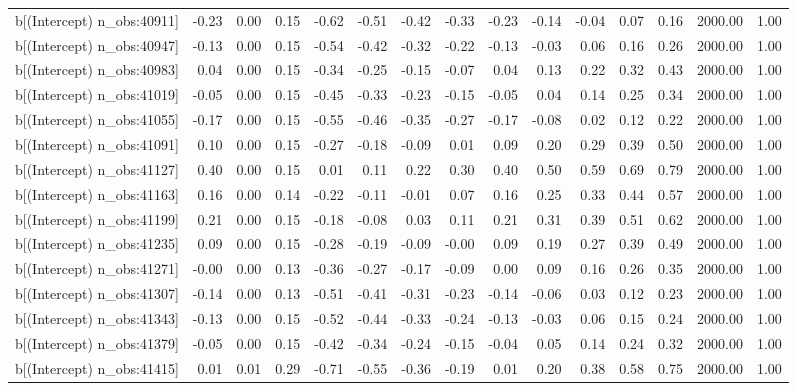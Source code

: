 \begin{table}[ht]
\begin{tabular}{rrrrrrrrrrrrrrr}
  b[(Intercept) n\_obs:40911] & -0.23 & 0.00 & 0.15 & -0.62 & -0.51 & -0.42 & -0.33 & -0.23 & -0.14 & -0.04 & 0.07 & 0.16 & 2000.00 & 1.00 \\ 
  b[(Intercept) n\_obs:40947] & -0.13 & 0.00 & 0.15 & -0.54 & -0.42 & -0.32 & -0.22 & -0.13 & -0.03 & 0.06 & 0.16 & 0.26 & 2000.00 & 1.00 \\ 
  b[(Intercept) n\_obs:40983] & 0.04 & 0.00 & 0.15 & -0.34 & -0.25 & -0.15 & -0.07 & 0.04 & 0.13 & 0.22 & 0.32 & 0.43 & 2000.00 & 1.00 \\ 
  b[(Intercept) n\_obs:41019] & -0.05 & 0.00 & 0.15 & -0.45 & -0.33 & -0.23 & -0.15 & -0.05 & 0.04 & 0.14 & 0.25 & 0.34 & 2000.00 & 1.00 \\ 
  b[(Intercept) n\_obs:41055] & -0.17 & 0.00 & 0.15 & -0.55 & -0.46 & -0.35 & -0.27 & -0.17 & -0.08 & 0.02 & 0.12 & 0.22 & 2000.00 & 1.00 \\ 
  b[(Intercept) n\_obs:41091] & 0.10 & 0.00 & 0.15 & -0.27 & -0.18 & -0.09 & 0.01 & 0.09 & 0.20 & 0.29 & 0.39 & 0.50 & 2000.00 & 1.00 \\ 
  b[(Intercept) n\_obs:41127] & 0.40 & 0.00 & 0.15 & 0.01 & 0.11 & 0.22 & 0.30 & 0.40 & 0.50 & 0.59 & 0.69 & 0.79 & 2000.00 & 1.00 \\ 
  b[(Intercept) n\_obs:41163] & 0.16 & 0.00 & 0.14 & -0.22 & -0.11 & -0.01 & 0.07 & 0.16 & 0.25 & 0.33 & 0.44 & 0.57 & 2000.00 & 1.00 \\ 
  b[(Intercept) n\_obs:41199] & 0.21 & 0.00 & 0.15 & -0.18 & -0.08 & 0.03 & 0.11 & 0.21 & 0.31 & 0.39 & 0.51 & 0.62 & 2000.00 & 1.00 \\ 
  b[(Intercept) n\_obs:41235] & 0.09 & 0.00 & 0.15 & -0.28 & -0.19 & -0.09 & -0.00 & 0.09 & 0.19 & 0.27 & 0.39 & 0.49 & 2000.00 & 1.00 \\ 
  b[(Intercept) n\_obs:41271] & -0.00 & 0.00 & 0.13 & -0.36 & -0.27 & -0.17 & -0.09 & 0.00 & 0.09 & 0.16 & 0.26 & 0.35 & 2000.00 & 1.00 \\ 
  b[(Intercept) n\_obs:41307] & -0.14 & 0.00 & 0.13 & -0.51 & -0.41 & -0.31 & -0.23 & -0.14 & -0.06 & 0.03 & 0.12 & 0.23 & 2000.00 & 1.00 \\ 
  b[(Intercept) n\_obs:41343] & -0.13 & 0.00 & 0.15 & -0.52 & -0.44 & -0.33 & -0.24 & -0.13 & -0.03 & 0.06 & 0.15 & 0.24 & 2000.00 & 1.00 \\ 
  b[(Intercept) n\_obs:41379] & -0.05 & 0.00 & 0.15 & -0.42 & -0.34 & -0.24 & -0.15 & -0.04 & 0.05 & 0.14 & 0.24 & 0.32 & 2000.00 & 1.00 \\ 
  b[(Intercept) n\_obs:41415] & 0.01 & 0.01 & 0.29 & -0.71 & -0.55 & -0.36 & -0.19 & 0.01 & 0.20 & 0.38 & 0.58 & 0.75 & 2000.00 & 1.00 \\ 

\end{tabular}
\end{table}
